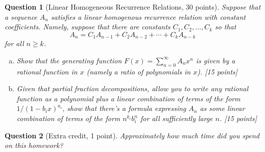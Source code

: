 \documentclass{article}
\newtheorem{ques}{Question}
\begin{document}
\begin{ques}[Linear Homogeneous Recurrence Relations, 30 points]
Suppose that a sequence $A_n$ satisfies a linear homogenous recurrence relation with constant coefficients. Namely, suppose that there are constants $C_1,C_2,\ldots,C_k$ so that
$$
A_n = C_1 A_{n-1}+C_2 A_{n-2}+\cdots+ C_kA_{n-k}
$$
for all $n\geq k$.
\begin{enumerate}[(a)]
\item Show that the generating function $F(x) = \sum_{n=0}^\infty A_n x^n$ is given by a rational function in $x$ (namely a ratio of polynomials in $x$). [15 points]
\item Given that partial fraction decompositions, allow you to write any rational function as a polynomial plus a linear combination of terms of the form $1/(1-b_i x)^{a_i}$, show that there's a formula expressing $A_n$ as some linear combination of terms of the form $n^{k_i} b_i^n$ for all sufficiently large $n$. [15 points]
\end{enumerate}
\end{ques}

\begin{ques}[Extra credit, 1 point]
Approximately how much time did you spend on this homework?
\end{ques}
\end{document}
